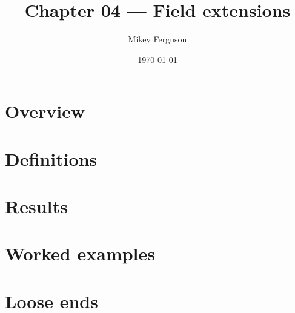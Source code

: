 \documentclass[11pt]{article}
\title{Chapter 04 --- Field extensions}
\author{Mikey Ferguson}
\date{\today}
\begin{document}
\maketitle
\tableofcontents
\bigskip

\section{Overview}

\section{Definitions}

\section{Results}

\section{Worked examples}

\section{Loose ends}
\end{document}
